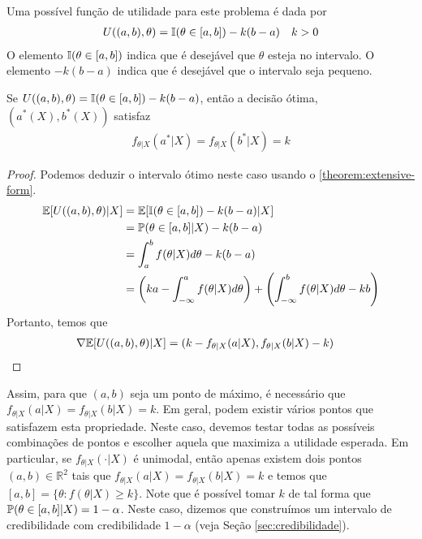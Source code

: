 Uma possível função de utilidade para 
este problema é dada por
\begin{align*}
 U((a,b),\theta)
 &= \I(\theta \in [a,b]) -k(b-a)
 & k > 0
\end{align*}
O elemento $\I(\theta \in [a,b])$ indica que 
é desejável que $\theta$ esteja no intervalo.
O elemento $-k(b-a)$ indica que 
é desejável que o intervalo seja pequeno.
\begin{theorem}
 \label{thm:credible_interval_1}
 Se $U((a,b),\theta) = \I(\theta \in [a,b]) -k(b-a)$,
 então a decisão ótima, $(a^{*}(X),b^{*}(X))$ satisfaz
 \begin{align*}
  f_{\theta|X}(a^{*}|X)
  =f_{\theta|X}(b^{*}|X) = k
 \end{align*}
\end{theorem}
\begin{proof}
 Podemos deduzir o intervalo ótimo neste caso 
 usando o \cref{theorem:extensive-form}. 
 \begin{align*}
  \E[U((a,b),\theta)|X]	
  &= \E[\I(\theta \in [a,b]) -k(b-a)|X] \\
  &= \P(\theta \in [a,b]|X) -k(b-a) \\
  &= \int_{a}^{b}{f(\theta|X)d\theta} -k(b-a) \\
  &= \left(ka-\int_{-\infty}^{a}{f(\theta|X)d\theta}\right) 
  +\left(\int_{-\infty}^{b}{f(\theta|X)d\theta}-kb\right)
 \end{align*}
 Portanto, temos que
 \begin{align*}
  \nabla \E[U((a,b),\theta)|X]
  &= (k-f_{\theta|X}(a|X), f_{\theta|X}(b|X)-k)
 \end{align*}
\end{proof}
Assim, para que $(a,b)$ seja um ponto de máximo,
é necessário que
$f_{\theta|X}(a|X) = f_{\theta|X}(b|X) = k$.
Em geral, podem existir vários pontos que 
satisfazem esta propriedade.
Neste caso, devemos testar 
todas as possíveis combinações de pontos
e escolher aquela que maximiza a utilidade esperada.
Em particular, se $f_{\theta|X}(\cdot|X)$ é unimodal, 
então apenas existem dois pontos 
$(a,b) \in \mathbb{R}^{2}$ tais que 
$f_{\theta|X}(a|X) = f_{\theta|X}(b|X) = k$ e temos que
$[a,b] = \{\theta: f(\theta|X) \geq k\}$.
Note que é possível tomar $k$ de tal forma que 
$\P(\theta \in [a,b]|X) = 1-\alpha$.
Neste caso, dizemos que construímos um 
intervalo de credibilidade com 
credibilidade $1-\alpha$ (veja Seção \ref{sec:credibilidade}).

